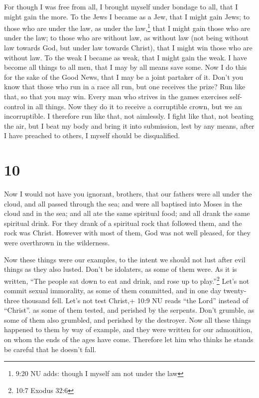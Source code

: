  For though I was free from all, I brought myself under
bondage to all, that I might gain the more.  To the Jews I
became as a Jew, that I might gain Jews; to those who are under the law,
as under the law,\footnote{9:20 NU adds: though I myself am not under
  the law} that I might gain those who are under the law; 
to those who are without law, as without law (not being without law
towards God, but under law towards Christ), that I might win those who
are without law.  To the weak I became as weak, that I
might gain the weak. I have become all things to all men, that I may by
all means save some.  Now I do this for the sake of the
Good News, that I may be a joint partaker of it.  Don't you
know that those who run in a race all run, but one receives the prize?
Run like that, so that you may win.  Every man who strives
in the games exercises self-control in all things. Now they do it to
receive a corruptible crown, but we an incorruptible.  I
therefore run like that, not aimlessly. I fight like that, not beating
the air,  but I beat my body and bring it into submission,
lest by any means, after I have preached to others, I myself should be
disqualified.

\hypertarget{section-9}{%
\section{10}\label{section-9}}

 Now I would not have you ignorant, brothers, that our
fathers were all under the cloud, and all passed through the sea;
 and were all baptised into Moses in the cloud and in the
sea;  and all ate the same spiritual food;  and
all drank the same spiritual drink. For they drank of a spiritual rock
that followed them, and the rock was Christ.  However with
most of them, God was not well pleased, for they were overthrown in the
wilderness.

 Now these things were our examples, to the intent we should
not lust after evil things as they also lusted.  Don't be
idolaters, as some of them were. As it is written, ``The people sat down
to eat and drink, and rose up to play.''\footnote{10:7 Exodus 32:6}
 Let's not commit sexual immorality, as some of them
committed, and in one day twenty-three thousand fell.  Let's
not test Christ,+ 10:9 NU reads ``the Lord'' instead of ``Christ''. as
some of them tested, and perished by the serpents.  Don't
grumble, as some of them also grumbled, and perished by the destroyer.
 Now all these things happened to them by way of example,
and they were written for our admonition, on whom the ends of the ages
have come.  Therefore let him who thinks he stands be
careful that he doesn't fall.

